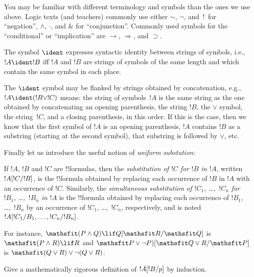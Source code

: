 \documentclass[../../../include/open-logic-section]{subfiles}
\begin{document}

\begin{intro}
You may be familiar with different terminology and symbols than the
ones we use above. Logic texts (and teachers) commonly use either
$\sim$, $\neg$, and~!\ for ``negation'', $\wedge$, $\cdot$, and $\&$
for ``conjunction''.  Commonly used symbols for the ``conditional'' or
``implication'' are $\rightarrow$, $\Rightarrow$, and $\supset$.
\end{intro}

\begin{defn}
The symbol $\ident$ expresses syntactic identity between strings of
symbols, i.e., $!A \ident !B$ iff $!A$ and $!B$ are strings of symbols
of the same length and which contain the same symbol in each place.
\end{defn}

\begin{explain}
The $\ident$ symbol may be flanked by strings obtained by
concatenation, e.g., $!A \ident (!B \lor !C)$ means: the string of
symbols~$!A$ is the same string as the one obtained by concatenating
an opening parenthesis, the string $!B$, the $\lor$ symbol, the
string~$!C$, and a closing parenthesis, in this order. If this is the
case, then we know that the first symbol of $!A$ is an opening
parenthesis, $!A$ contains $!B$ as a substring (starting at the second
symbol), that substring is followed by $\lor$, etc.
\end{explain}

Finally let us introduce the useful notion of \emph{uniform substution}:

\begin{defn}
If $!A$, $!B$ and $!C$ are !!{formula}s, then the \emph{substitution of $!C$ for $!B$ in $!A$}, written $!A[!C/!B]$, is the !!{formula} obtained by replacing each occurrence of $!B$ in $!A$ with an occurrence of $!C$. Similarly, the \emph{simultaneous substitution of $!C_1$, \dots,~$!C_n$ for $!B_1$, \dots,~$!B_n$ in $!A$} is the !!{formula} obtained by replacing each occurrence of $!B_1$, \dots,~$!B_n$ by an occurrence of $!C_1$, \dots,~$!C_n$, respectively, and is noted $!A[!C_1/B_1,\dots,!C_n/!B_n]$.
\end{defn}

For instance, $\Subst{\Obj (P \land Q) \lif Q}{\Obj R}{\Obj Q}$ is $\Obj (P \land R) \lif R$ and $\Subst{\Obj P \lor \lnot P)}{\Obj Q \lor R}{\Obj P}$ is $\Obj (Q \lor R) \lor \lnot (Q \lor R)$.

\begin{prob}
Give a mathematically rigorous definition of $!A[!B/p]$ by
induction.
\end{prob}
\end{document}
